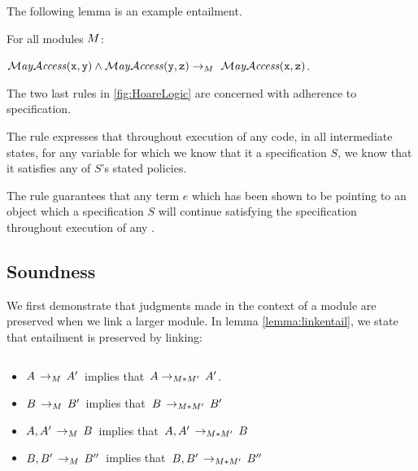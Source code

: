 The following lemma is an example entailment.
\begin{lemma} For all modules $M$:
$ ~ $

\noindent$ \MayAccess(\prg{x},\prg{y}) \wedge \MayAccess({\prg{y},\prg{z}})  \rightarrow_\M \ \MayAccess(\prg{x},\prg{z}) $.

\end{lemma} 

The two last rules in \ref{fig:HoareLogic} are concerned with adherence to specification.

The rule  expresses that throughout execution of any code, in all intermediate states, for any variable  for which we know that it \obeys a specification $S$, we know that it satisfies any of $S$'s stated policies. 

The rule  guarantees that any term $e$ which has been shown to be pointing to an object which \obeys a specification $S$ will continue satisfying the specification throughout execution of any . 


\subsection{Soundness}

We first demonstrate that judgments made in the context of a module are preserved when we link a larger module. 
In lemma \ref{lemma:linkentail}, we state that entailment is preserved by linking:

\begin{lemma}
\label{lemma:linkentail}
$ $ \\

\begin{itemize}
\item
$A\, \rightarrow_M\, A'$\ implies that\  $A  \rightarrow_{M*M'}\, A'$.
\item
$B\, \rightarrow_M\, B'$\ implies that\  $B\, \rightarrow_{M*M'}\,  B'$
 \item
$A,A'\, \rightarrow_M\, B$\ implies that\  $A,A'\, \rightarrow_{M*M'}\,  B$
\item
$B,B'\, \rightarrow_M\, B''$\ implies that\  $B,B'\, \rightarrow_{M*M'}\,  B''$
\end{itemize}
\end{lemma}

